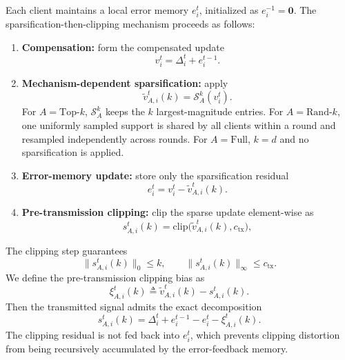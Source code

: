 \documentclass[journal]{IEEEtran}
\begin{document}
Each client maintains a local error memory $e_i^t$, initialized as $e_i^{-1}=\mathbf{0}$. The sparsification-then-clipping mechanism proceeds as follows:
\begin{enumerate}
    \item \textbf{Compensation:} form the compensated update
    \begin{equation}
        v_i^t=\Delta_i^t+e_i^{t-1}.
    \end{equation}
    \item \textbf{Mechanism-dependent sparsification:} apply
    \begin{equation}
        \tilde v_{A,i}^t(k)=\mathcal{S}_A^k(v_i^t).
    \end{equation}
    For $A=\mathrm{Top}\text{-}k$, $\mathcal{S}_A^k$ keeps the $k$ largest-magnitude entries. For $A=\mathrm{Rand}\text{-}k$, one uniformly sampled support is shared by all clients within a round and resampled independently across rounds. For $A=\mathrm{Full}$, $k=d$ and no sparsification is applied.
    \item \textbf{Error-memory update:} store only the sparsification residual
    \begin{equation}
        e_i^t=v_i^t-\tilde v_{A,i}^t(k).
    \end{equation}
    \item \textbf{Pre-transmission clipping:} clip the sparse update element-wise as
    \begin{equation}
        s_{A,i}^t(k)=\mathrm{clip}\big(\tilde v_{A,i}^t(k),c_{\mathrm{tx}}\big),
    \end{equation}
\end{enumerate}
The clipping step guarantees
\begin{equation}
    \|s_{A,i}^t(k)\|_0\le k,
    \qquad
    \|s_{A,i}^t(k)\|_{\infty}\le c_{\mathrm{tx}}.
\end{equation}
We define the pre-transmission clipping bias as
\begin{equation}
    \xi_{A,i}^t(k)\triangleq \tilde v_{A,i}^t(k)-s_{A,i}^t(k).
\end{equation}
Then the transmitted signal admits the exact decomposition
\begin{equation}
    \label{eqn:transmit_signal}
    s_{A,i}^t(k)
    =\Delta_i^t+e_i^{t-1}-e_i^t-\xi_{A,i}^t(k).
\end{equation}
The clipping residual is not fed back into $e_i^t$, which prevents clipping distortion from being recursively accumulated by the error-feedback memory.
\end{document}
